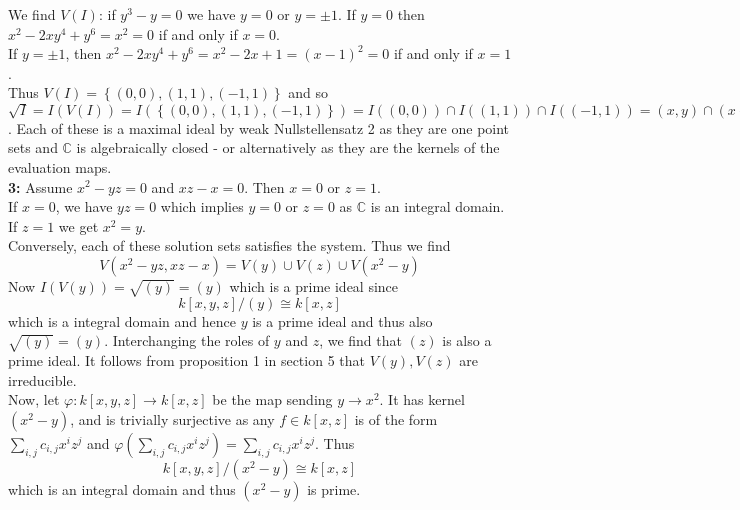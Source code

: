 \documentclass[a4paper]{article}
\begin{document}
       We find $V(I)$: if $y^3 - y = 0$ we have $y=0$ or $y = \pm 1$. If
       $y = 0$ then $x^2 - 2xy^{4} + y^{6} = x^2 = 0$ if and only if $x = 0$.\\
       If $y = \pm 1$, then $x^2 - 2x y^{4} + y^{6} = x^2 - 2x + 1 = 
       (x-1)^2 = 0$ if and only if 
       $x= 1$.\\
       Thus
       $V(I) = \left\{ (0,0), (1,1), (-1,1) \right\} $ and so
       $\sqrt{I} = I\left( V\left( I \right)  \right) 
       = I\left( \left\{ (0,0), (1,1), (-1,1) \right\}  \right) 
       = I\left( (0,0) \right) \cap I\left( (1,1) \right) \cap I\left( (-1,1) \right) 
       = \left( x,y \right) \cap \left( x-1, y-1 \right) \cap (x+1, y-1)$. Each
       of
       these is a maximal ideal by weak Nullstellensatz 2 as they are one point
       sets and $\mathbb{C}$ is algebraically closed -
       or alternatively as they are the kernels of the evaluation maps.\\
       \linebreak
       \textbf{3:} Assume $x^2 - yz = 0$ and $xz -x = 0$. Then $x = 0$ or
       $z=1$.\\
       If $x = 0$, we have $yz = 0$ which implies $y=0$ or $z=0$ as
       $ \mathbb{C}$ is an integral domain.\\
       If $z = 1$ we get $x^2 = y$.\\
       Conversely, each of these solution sets satisfies the system. Thus
       we find
       \[
       V\left( x^2 - yz, xz - x \right)  
       = V(y) \cup V(z) \cup V(x^2 - y)
       \] 
      Now $I \left( V\left( y \right)  \right) 
      = \sqrt{(y)} = (y)$ which is a prime ideal since
      \[
      k\left[ x, y, z \right] /(y) \cong k\left[ x,z \right] 
      \] 
      which is a integral domain and hence $y$ is a prime ideal and thus also
      $ \sqrt{(y)} = (y)$.
      Interchanging the roles of $y$ and $z$, we find that
      $(z)$ is also a prime ideal. It follows from proposition 1 in section
      5 that
      $V(y), V(z)$ are irreducible.\\
      Now, let $\varphi \colon k\left[ x,y,z \right] \to k\left[ x,z \right] $ 
      be the map sending $y \to x^2$. It has kernel $(x^2 -y)$, and
      is trivially surjective as any $f\in k\left[ x,z \right] $ 
      is of the form $\sum_{i,j} c_{i,j}x^{i}z^{j}$ and 
      $\varphi\left( \sum_{i,j} c_{i,j}x^{i}z^{j} \right) 
      =  \sum_{i,j} c_{i,j}x^{i}z^{j}$. Thus
      \[
      k\left[ x,y,z \right] / (x^2 - y) \cong k\left[ x,z \right] 
      \] 
      which is an integral domain and thus $(x^2 - y)$ is prime.
\end{document}
